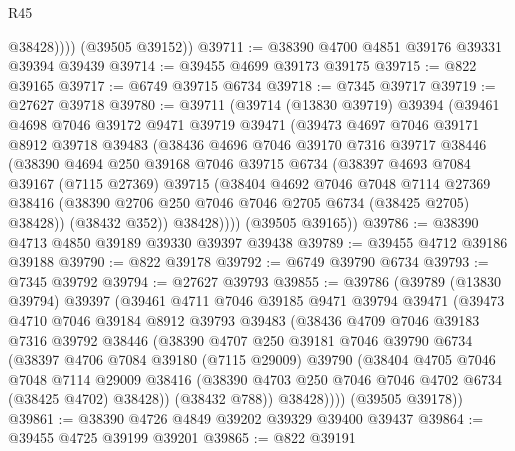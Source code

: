 \begin{lexlean}{R45}
\begin{coremodule}
{              @38428))))
      (@39505 @39152))
@39711 := @38390 @4700 @4851 @39176 @39331 @39394 @39439
@39714 := @39455 @4699 @39173 @39175
@39715 := @822 @39165
@39717 := @6749 @39715 @6734
@39718 := @7345 @39717
@39719 := @27627 @39718
@39780 := @39711
    (@39714
      (@13830 @39719)
      @39394
      (@39461
        @4698
        @7046
        @39172
        @9471
        @39719
        @39471
        (@39473
          @4697
          @7046
          @39171
          @8912
          @39718
          @39483
          (@38436
            @4696
            @7046
            @39170
            @7316
            @39717
            @38446
            (@38390
              @4694
              @250
              @39168
              @7046
              @39715
              @6734
              (@38397
                @4693
                @7084
                @39167
                (@7115 @27369)
                @39715
                (@38404
                  @4692
                  @7046
                  @7048
                  @7114
                  @27369
                  @38416
                  (@38390 @2706 @250 @7046 @7046 @2705 @6734 (@38425 @2705) @38428))
                (@38432 @352))
              @38428))))
      (@39505 @39165))
@39786 := @38390 @4713 @4850 @39189 @39330 @39397 @39438
@39789 := @39455 @4712 @39186 @39188
@39790 := @822 @39178
@39792 := @6749 @39790 @6734
@39793 := @7345 @39792
@39794 := @27627 @39793
@39855 := @39786
    (@39789
      (@13830 @39794)
      @39397
      (@39461
        @4711
        @7046
        @39185
        @9471
        @39794
        @39471
        (@39473
          @4710
          @7046
          @39184
          @8912
          @39793
          @39483
          (@38436
            @4709
            @7046
            @39183
            @7316
            @39792
            @38446
            (@38390
              @4707
              @250
              @39181
              @7046
              @39790
              @6734
              (@38397
                @4706
                @7084
                @39180
                (@7115 @29009)
                @39790
                (@38404
                  @4705
                  @7046
                  @7048
                  @7114
                  @29009
                  @38416
                  (@38390 @4703 @250 @7046 @7046 @4702 @6734 (@38425 @4702) @38428))
                (@38432 @788))
              @38428))))
      (@39505 @39178))
@39861 := @38390 @4726 @4849 @39202 @39329 @39400 @39437
@39864 := @39455 @4725 @39199 @39201
@39865 := @822 @39191
}
\end{coremodule}
\end{lexlean}
